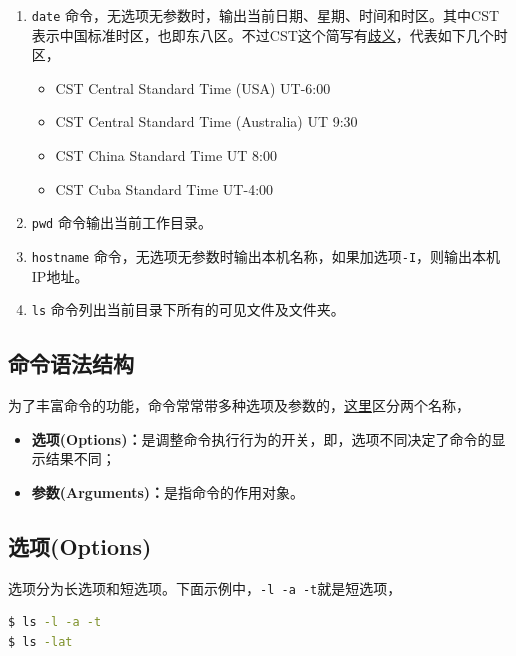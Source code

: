 \documentclass[doctor,openright,twoside]{sjtuthesis}
\providecommand{\tightlist}{%
    \setlength{\itemsep}{0pt}\setlength{\parskip}{0pt}}
\newcommand{\passthrough}[1]{#1}
\theoremstyle{plain}
\theoremstyle{definition}
\theoremstyle{remark}
\theoremstyle{ocrenumbox}
\theoremstyle{plain}
\begin{document}
\begin{enumerate}
\def\labelenumi{\arabic{enumi}.}
\tightlist
\item
  \passthrough{\lstinline!date!}
  命令，无选项无参数时，输出当前日期、星期、时间和时区。其中CST表示中国标准时区，也即东八区。不过CST这个简写有\href{https://blog.csdn.net/sjpljr/article/details/70169056}{歧义}，代表如下几个时区，

  \begin{itemize}
  \tightlist
  \item
    CST Central Standard Time (USA) UT-6:00
  \item
    CST Central Standard Time (Australia) UT 9:30
  \item
    CST China Standard Time UT 8:00
  \item
    CST Cuba Standard Time UT-4:00
  \end{itemize}
\item
  \passthrough{\lstinline!pwd!} 命令输出当前工作目录。
\item
  \passthrough{\lstinline!hostname!}
  命令，无选项无参数时输出本机名称，如果加选项\passthrough{\lstinline!-I!}，则输出本机IP地址。
\item
  \passthrough{\lstinline!ls!}
  命令列出当前目录下所有的可见文件及文件夹。
\end{enumerate}

\subsection{命令语法结构}

为了丰富命令的功能，命令常常带多种选项及参数的，\href{https://www.jb51.net/os/RedHat/518485.html}{这里}区分两个名称，

\begin{itemize}
\tightlist
\item
  \textbf{选项(Options)：}是调整命令执行行为的开关，即，选项不同决定了命令的显示结果不同；
\item
  \textbf{参数(Arguments)：}是指命令的作用对象。
\end{itemize}

\hypertarget{options}{%
\subsection{选项(Options)}\label{options}}

选项分为长选项和短选项。下面示例中，\passthrough{\lstinline!-l -a -t!}就是短选项，

\begin{lstlisting}[language=bash]
$ ls -l -a -t
$ ls -lat
\end{lstlisting}
\end{document}
